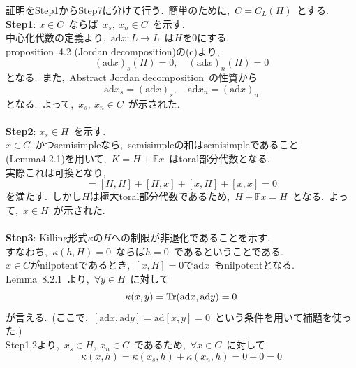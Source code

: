 \documentclass[uplatex,dvipdfmx]{jsarticle}
\begin{document}
\begin{myproof}
    証明をStep1からStep7に分けて行う.~簡単のために,~$C = C_L(H)$~とする.\\
    \textbf{Step1}:
    $x \in C$~ならば~$x_s,~x_n \in C$~を示す.\\
    中心化代数の定義より,~$\text{ad}x:L\to L$~は$H$を$0$にする.\\
    proposition~4.2 (Jordan decomposition)の(c)より,
    \begin{equation*}
        (\text{ad}x)_s(H) = 0, \quad (\text{ad}x)_n(H) = 0
    \end{equation*}
    となる.~また,~Abstract Jordan decomposition~の性質から
    \begin{equation*}
        \text{ad}x_s = (\text{ad}x)_s, \quad \text{ad}x_n = (\text{ad}x)_n
    \end{equation*}
    となる.~よって,~$x_s,~x_n \in C$~が示された.\\\\
    \textbf{Step2}:
    $x_s \in H$~を示す.\\
    $x\in C$~かつsemisimpleなら,~semisimpleの和はsemisimpleであること(Lemma4.2.1)を用いて,~$K = H + \mathbb{F}x$~はtoral部分代数となる.~\\
    実際これは可換となり,
    \begin{equation*}
        [K,K] = [H,H] + [H,x] + [x,H] + [x,x] = 0
    \end{equation*}
    を満たす.~しかし$H$は極大toral部分代数であるため,~$H+\mathbb{F}x = H$~となる.~よって,~$x \in H$~が示された.\\\\
    \textbf{Step3}:
    Killing形式$\kappa$の$H$への制限が非退化であることを示す.\\
    すなわち,~$\kappa(h,H) = 0$~ならば$h=0$~であるということである.\\
    $x \in C$がnilpotentであるとき,~$[x,H]=0$で$\text{ad}x$~もnilpotentとなる.
    Lemma~8.2.1~より,~$\forall y \in H$~に対して
    \begin{equation*}
        \kappa(x,y) = \Tr(\text{ad}x , \text{ad}y) = 0
    \end{equation*}
    が言える.~(ここで,~$[\text{ad}x, \text{ad}y] = \text{ad}[x,y] = 0$~という条件を用いて補題を使った.)\\
    Step1,2より,~$x_s\in H,~x_n\in C$~であるため,~$\forall x \in C$~に対して
    \begin{equation*}
        \kappa(x,h) = \kappa(x_s,h) + \kappa(x_n,h) = 0 + 0 = 0
    \end{equation*}

\end{myproof}
\end{document}
